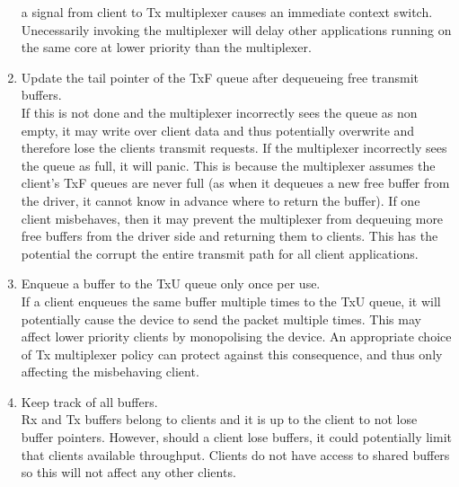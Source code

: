 \begin{enumerate}
    a signal from client to Tx multiplexer causes an immediate context switch. Unecessarily invoking the multiplexer will delay other 
    applications running on the same core at lower priority than the multiplexer.
    \item Update the tail pointer of the TxF queue after dequeueing free transmit buffers.\\
    If this is not done and the multiplexer incorrectly sees the queue as non empty, it may write over client data and
    thus potentially overwrite and therefore lose the clients transmit requests. If
    the multiplexer incorrectly sees the queue as full, it will panic. This is because the multiplexer assumes the client's 
    TxF queues are never full (as when it dequeues a new free buffer from the driver, it cannot know in advance where 
    to return the buffer). If one client misbehaves, then it may prevent the multiplexer from dequeuing more free buffers 
    from the driver side and returning them to clients. This has the potential the corrupt the entire transmit path for all
    client applications.
    \item Enqueue a buffer to the TxU queue only once per use.\\
    If a client enqueues the same buffer multiple times to the TxU queue, it will potentially cause the device to send the
    packet multiple times. This may affect lower priority clients by monopolising the device. An appropriate choice of Tx multiplexer
    policy can protect against this consequence, and thus only affecting the misbehaving client.
    \item Keep track of all buffers.\\
    Rx and Tx buffers belong to clients and it is up to the client to not lose buffer pointers. However, should a client lose
    buffers, it could potentially limit that clients available throughput. Clients do not have access to shared buffers so this
    will not affect any other clients.
\end{enumerate}

